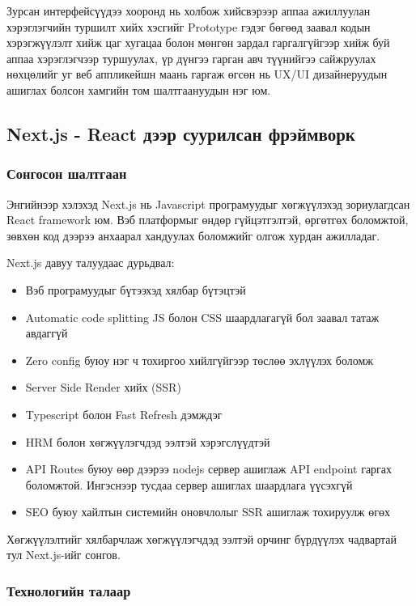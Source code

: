 Зурсан интерфейсүүдээ хооронд нь холбож хийсвэрээр аппаа ажиллуулан хэрэглэгчийн туршилт хийх хэсгийг Prototype гэдэг бөгөөд заавал кодын хэрэгжүүлэлт хийж цаг хугацаа болон мөнгөн зардал гаргалгүйгээр хийж буй аппаа хэрэглэгчээр туршуулах, үр дүнгээ гарган авч түүнийгээ сайжруулах нөхцөлийг уг веб аппликейшн маань гаргаж өгсөн нь UX/UI дизайнеруудын ашиглах болсон хамгийн том шалтгаануудын нэг юм.

\subsection{Next.js - React дээр суурилсан фрэймворк}

\subsubsection{Сонгосон шалтгаан}

Энгийнээр хэлэхэд Next.js нь Javascript програмуудыг хөгжүүлэхэд зориулагдсан React framework юм. Вэб платформыг өндөр гүйцэтгэлтэй, өргөтгөх боломжтой, зөвхөн код дээрээ анхаарал хандуулах боломжийг олгож хурдан ажилладаг.

Next.js давуу талуудаас дурьдвал:
\begin{itemize}
	\item Вэб програмуудыг бүтээхэд хялбар бүтэцтэй
	\item Automatic code splitting JS болон CSS шаардлагагүй бол заавал татаж авдаггүй 
	\item Zero config буюу нэг ч тохиргоо хийлгүйгээр төслөө эхлүүлэх боломж
	\item Server Side Render хийх (SSR)
	\item Typescript болон Fast Refresh дэмждэг
	\item HRM болон хөгжүүлэгчдэд ээлтэй хэрэгслүүдтэй
	\item API Routes буюу өөр дээрээ nodejs сервер ашиглаж API endpoint гаргах боломжтой. Ингэснээр тусдаа сервер ашиглах шаардлага үүсэхгүй
	\item SEO буюу хайлтын системийн оновчлолыг SSR ашиглаж тохируулж өгөх
\end{itemize}

Хөгжүүлэлтийг хялбарчлаж хөгжүүлэгчдэд ээлтэй орчинг бүрдүүлэх чадвартай тул Next.js-ийг сонгов.

\subsubsection{Технологийн талаар}

